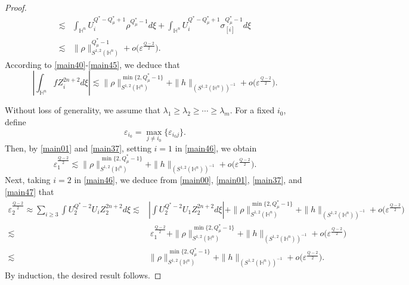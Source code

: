 \documentclass[11pt]{article}
\begin{document}
\begin{proof}
\begin{align}
\lesssim&
\int_{\mathbb{H}^{n}}U_i^{Q^{\ast}-Q_\mu^*+1}\rho^{Q^{\ast}_{\mu}-1}d\xi+\int_{\mathbb{H}^{n}}U_i^{Q^{\ast}-Q_\mu^*+1}\sigma_{[i]}^{Q^{\ast}_{\mu}-1}
d\xi \nonumber\\
\lesssim&
\|\rho\|_{S^{1,2}(\mathbb{H}^{n})}^{Q^{\ast}_{\mu}-1}+o\Big(\varepsilon^{\frac{Q-2}{2}}\Big).
\end{align}
According to \eqref{main40}-\eqref{main45}, we deduce that
 \begin{equation}\label{main46}
   \left| \int_{\mathbb{H}^n} f Z_i^{2n+2} d\xi\right|
\lesssim \|\rho\|_{S^{1,2}(\mathbb{H}^{n})}^{\min\{2,Q_\mu^*-1\}}%
     +\|h\|_{(S^{1,2}(\mathbb{H}^{n}))^{-1}}+o\Big(\varepsilon^{\frac{Q-2}{2}}\Big).
 \end{equation}

 Without loss of generality, we assume that $\lambda_1\geq \lambda_2 \geq\cdots \geq \lambda_m$. For a fixed $i_0$, define
 \begin{equation*}
   \varepsilon_{i_0}=\max\limits_{j\neq i_0}\{\varepsilon_{i_0j}\}.
 \end{equation*}
 Then, by \eqref{main01} and \eqref{main37}, setting $i=1$ in \eqref{main46}, we obtain
 \begin{equation}\label{main47}
   \varepsilon_1^{\frac{Q-2}{2}}
\lesssim \|\rho\|_{S^{1,2}(\mathbb{H}^{n})}^{\min\{2,Q_\mu^*-1\}}%
     +\|h\|_{(S^{1,2}(\mathbb{H}^{n}))^{-1}}+o\Big(\varepsilon^{\frac{Q-2}{2}}\Big).
 \end{equation}
 Next, taking $i=2$ in \eqref{main46}, we deduce from \eqref{main00}, \eqref{main01}, \eqref{main37}, and \eqref{main47} that
 \begin{align*}
   \varepsilon_2^{\frac{Q-2}{2}}\approx  \sum_{i\geq3}
     \int U_2^{Q^*-2}U_i Z_2^{2n+2}d\xi  \lesssim & \left|\int U_2^{Q^*-2}U_1 Z_2^{2n+2}d\xi\right|+\|\rho\|_{S^{1,2}(\mathbb{H}^{n})}^{\min\{2,Q_\mu^*-1\}}%
     +\|h\|_{(S^{1,2}(\mathbb{H}^{n}))^{-1}}+o\Big(\varepsilon^{\frac{Q-2}{2}}\Big) \\
     \lesssim &
     ~ \varepsilon_1^{\frac{Q-2}{2}} +\|\rho\|_{S^{1,2}(\mathbb{H}^{n})}^{\min\{2,Q_\mu^*-1\}}%
     +\|h\|_{(S^{1,2}(\mathbb{H}^{n}))^{-1}}+o\Big(\varepsilon^{\frac{Q-2}{2}}\Big)\\
     \lesssim & \|\rho\|_{S^{1,2}(\mathbb{H}^{n})}^{\min\{2,Q_\mu^*-1\}}%
     +\|h\|_{(S^{1,2}(\mathbb{H}^{n}))^{-1}}+o\Big(\varepsilon^{\frac{Q-2}{2}}\Big).
 \end{align*}
By induction, the desired result follows.
\end{proof}
\end{document}
